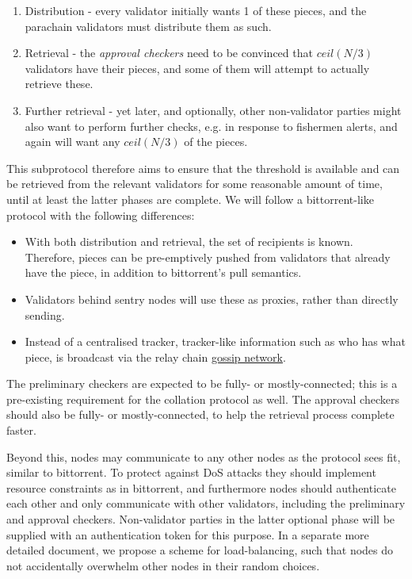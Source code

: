 \begin{enumerate}
\item Distribution - every validator initially wants 1 of these pieces, and the parachain validators must distribute them as such.
\item Retrieval - the \emph{approval checkers} need to be convinced that $ceil(N/3)$ validators have their pieces, and some of them will attempt to actually retrieve these.
\item Further retrieval - yet later, and optionally, other non-validator parties might also want to perform further checks, e.g. in response to fishermen alerts, and again will want any $ceil(N/3)$ of the pieces.
\end{enumerate}

This subprotocol therefore aims to ensure that the threshold is available and can be retrieved from the relevant validators for some reasonable amount of time, until at least the latter phases are complete. We will follow a bittorrent-like protocol with the following differences:

\begin{itemize}
\item With both distribution and retrieval, the set of recipients is known. Therefore, pieces can be pre-emptively pushed from validators that already have the piece, in addition to bittorrent's pull semantics.
\item Validators behind sentry nodes will use these as proxies, rather than directly sending.
\item Instead of a centralised tracker, tracker-like information such as who has what piece, is broadcast via the relay chain \hyperref[sec:gossiping]{gossip network}.
\end{itemize}

The preliminary checkers are expected to be fully- or mostly-connected; this is a pre-existing requirement for the collation protocol as well. The approval checkers should also be fully- or mostly-connected, to help the retrieval process complete faster.

Beyond this, nodes may communicate to any other nodes as the protocol sees fit, similar to bittorrent. To protect against DoS attacks they should implement resource constraints as in bittorrent, and furthermore nodes should authenticate each other and only communicate with other validators, including the preliminary and approval checkers. Non-validator parties in the latter optional phase will be supplied with an authentication token for this purpose. In a separate more detailed document, we propose a scheme for load-balancing, such that nodes do not accidentally overwhelm other nodes in their random choices.

